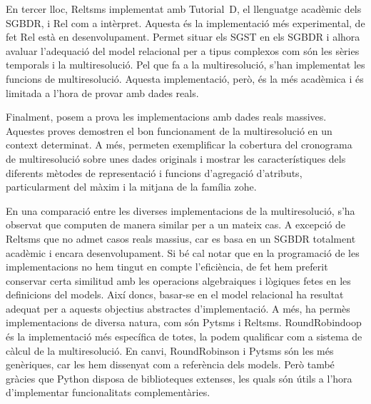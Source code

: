 En tercer lloc, Reltsms implementat amb Tutorial~D, el llenguatge
acadèmic dels \gls{SGBDR}, i Rel com a intèrpret.  Aquesta és la
implementació més experimental, de fet Rel està en desenvolupament.
Permet situar els \gls{SGST} en els \gls{SGBDR} i alhora avaluar
l'adequació del model relacional per a tipus complexos com són les
sèries temporals i la multiresolució.  Pel que fa a la multiresolució,
s'han implementat les funcions de multiresolució. Aquesta
implementació, però, és la més acadèmica i és limitada a l'hora de
provar amb dades reals.



Finalment, posem a prova les implementacions amb dades reals massives.
Aquestes proves demostren el bon funcionament de la multiresolució en
un context determinat. A més, permeten exemplificar la cobertura del
cronograma de multiresolució sobre unes dades originals i mostrar les
característiques dels diferents mètodes de representació i funcions
d'agregació d'atributs, particularment del màxim i la mitjana de la
família \gls{zohe}.




En una comparació entre les diverses implementacions de la
multiresolució, s'ha observat que computen de manera similar per a un
mateix cas. A excepció de Reltsms que no admet casos reals massius,
car es basa en un \gls{SGBDR} totalment acadèmic i encara
desenvolupament.  Si bé cal notar que en la programació de les
implementacions no hem tingut en compte l'eficiència, de fet hem
preferit conservar certa similitud amb les operacions algebraiques i
lògiques fetes en les definicions del models.    Així
doncs, basar-se en el model relacional ha resultat adequat per a
aquests objectius abstractes d'implementació. A més, ha permès
implementacions de diversa natura, com són Pytsms i Reltsms.
RoundRobindoop és la implementació més específica de totes, la podem
qualificar com a sistema de càlcul de la multiresolució. En canvi,
RoundRobinson i Pytsms són les més genèriques, car les hem dissenyat
com a referència dels models. Però també gràcies que Python disposa de
biblioteques extenses, les quals són útils a l'hora d'implementar
funcionalitats complementàries.



